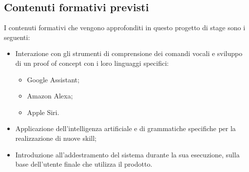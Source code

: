 \subsection{Contenuti formativi previsti}
I contenuti formativi che vengono approfonditi in questo progetto di stage sono i seguenti:
\begin{itemize}
	\item Interazione con gli strumenti di comprensione dei comandi vocali e sviluppo di un proof of concept con i loro linguaggi specifici:
		\begin{itemize}
			\item Google Assistant;
			\item Amazon Alexa;
			\item Apple Siri.
		\end{itemize}
	\item Applicazione dell'intelligenza artificiale e di grammatiche specifiche per la realizzazione di nuove skill;
	\item Introduzione all'addestramento del sistema durante la sua esecuzione, sulla base dell'utente finale che utilizza il prodotto. 
\end{itemize}
